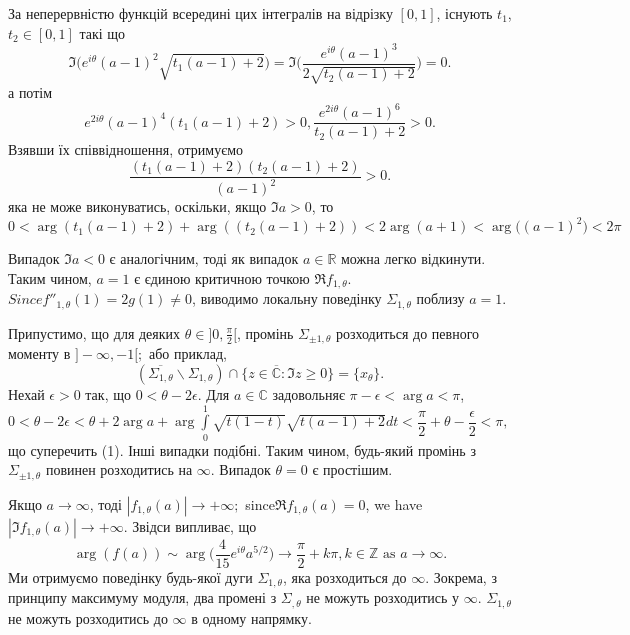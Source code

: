 \documentclass[a4paper]{article}
\newcommand{\dint}{\displaystyle\int}
\begin{document}
    За неперервністю функцій всередині цих інтегралів на відрізку $[0, 1]$, існують $t_1$, $t_2\in[0, 1]$ такі що
    $$\Im\Biggl(e^{i\theta}(a-1)^2\sqrt{t_1(a-1)+2}\Biggr)=\Im\Biggl(\dfrac{e^{i\theta}(a-1)^3}{2\sqrt{t_2(a-1)+2}}\Biggr)=0.$$
    а потім
    $$e^{2i\theta}(a-1)^4(t_1(a-1)+2)>0,\dfrac{e^{2i\theta}(a-1)^6}{t_2(a-1)+2}>0.$$
    Взявши їх співвідношення, отримуємо
    $$\dfrac{(t_1(a-1)+2)(t_2(a-1)+2)}{(a-1)^2}>0.$$
    яка не може виконуватись, оскільки, якщо $\Im a>0$, то
    $$0<\arg(t_1(a-1)+2)+\arg((t_2(a-1)+2))<2\arg(a+1)<\arg\big((a-1)^2\big)<2\pi$$

\newpage
\noindent
    Випадок $\Im a<0$ є аналогічним, тоді як випадок $a\in\mathbb{R}$ можна легко 
    відкинути. Таким чином, $a = 1$ є єдиною критичною точкою $\mathfrak{R}f_{1,\theta}$. 
    $Since f''_{1,\theta}(1)=2g(1)\ne0$, виводимо локальну поведінку $\Sigma_{1,\theta}$ поблизу $a = 1$.

    Припустимо, що для деяких $\theta\in]0,\frac{\pi}{2}[$, промінь $\Sigma_{\pm1,\theta}$ розходиться до
    певного моменту в $]-\infty, -1[;$ або приклад,
    $$(\overline{\Sigma_{1,\theta}}\backslash\Sigma_{1,\theta})\cap\{z\in\overline{\mathbb{C}}:\Im z\geq 0\}=\{x_\theta\}.$$
    Нехай $\epsilon > 0$ так, що $0 < \theta - 2\epsilon$. Для $a\in\mathbb{C}$ задовольняє $\pi-\epsilon<\arg a < \pi$,
    $0 < \theta - 2\epsilon < \theta + 2\arg a + \arg\dint\limits_{0}^{1}\sqrt{t(1-t)}\sqrt{t(a-1)+2}dt<\dfrac{\pi}{2}+\theta-\dfrac{\epsilon}{2}<\pi,$
    що суперечить (1). Інші випадки подібні. Таким чином, будь-який промінь
    з $\Sigma_{\pm1,\theta}$ повинен розходитись на $\infty$. Випадок $\theta = 0$ є простішим.

    Якщо $a\to\infty$, тоді $|f_{1,\theta}(a)|\to+\infty;$ since$\mathfrak{R}f_{1,\theta}(a)=0$, we have $|\Im f_{1,\theta}(a)|\to+\infty$. Звідси випливає, що
    $$\arg(f(a))\sim \arg\Biggl(\dfrac{4}{15}e^{i\theta}a^{5/2}\Biggr)\to\dfrac{\pi}{2}+k\pi,k\in\mathbb{Z}\text{ as } a\to\infty.$$
    Ми отримуємо поведінку будь-якої дуги $\Sigma_{1,\theta}$, яка розходиться до $\infty$. 
    Зокрема, з принципу максимуму модуля, два промені з $\Sigma_{,\theta}$ не можуть розходитись
    у $\infty$. $\Sigma_{1,\theta}$ не можуть розходитись до $\infty$ в одному напрямку.
\end{document}
